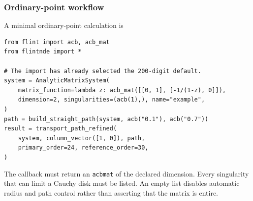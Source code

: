 \documentclass[11pt]{article}
\renewcommand{\_}{\origunderscore\allowbreak}
\begin{document}
\subsubsection{Ordinary-point workflow}
\label{subsec:transport-api}

A minimal ordinary-point calculation is
\begin{verbatim}
from flint import acb, acb_mat
from flintnde import *

# The import has already selected the 200-digit default.
system = AnalyticMatrixSystem(
    matrix_function=lambda z: acb_mat([[0, 1], [-1/(1-z), 0]]),
    dimension=2, singularities=(acb(1),), name="example",
)
path = build_straight_path(system, acb("0.1"), acb("0.7"))
result = transport_path_refined(
    system, column_vector([1, 0]), path,
    primary_order=24, reference_order=30,
)
\end{verbatim}
The callback must return an \texttt{acb\_mat} of the declared dimension.  Every singularity
that can limit a Cauchy disk must be listed.  An empty list disables automatic radius and
path control rather than asserting that the matrix is entire.
\end{document}
